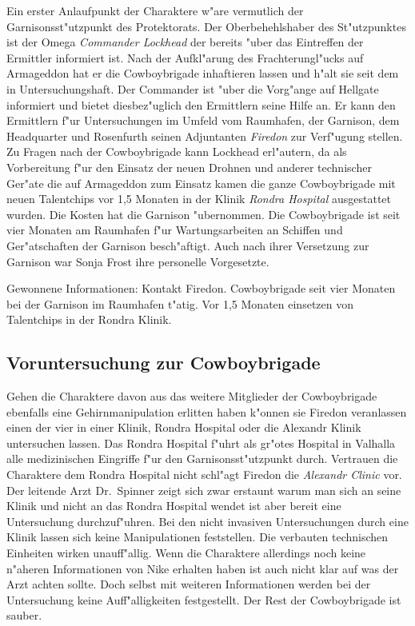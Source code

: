 Ein erster Anlaufpunkt der Charaktere w"are vermutlich der Garnisonsst"utzpunkt des Protektorats. Der Oberbehehlshaber des St"utzpunktes ist der Omega \emph{Commander Lockhead} der bereits "uber das Eintreffen der Ermittler informiert ist. Nach der Aufkl"arung des Frachterungl"ucks auf Armageddon hat er die Cowboybrigade inhaftieren lassen und h"alt sie seit dem in Untersuchungshaft. Der Commander ist "uber die Vorg"ange auf Hellgate informiert und bietet diesbez"uglich den Ermittlern seine Hilfe an. Er kann den Ermittlern f"ur Untersuchungen im Umfeld vom Raumhafen, der Garnison, dem Headquarter und Rosenfurth seinen Adjuntanten \emph{Firedon} zur Verf"ugung stellen. Zu Fragen nach der Cowboybrigade kann Lockhead erl"autern, da\3 als Vorbereitung f"ur den Einsatz der neuen Drohnen und anderer technischer Ger"ate die auf Armageddon zum Einsatz kamen die ganze Cowboybrigade mit neuen Talentchips vor 1,5 Monaten in der Klinik \emph{Rondra Hospital} ausgestattet wurden. Die Kosten hat die Garnison "ubernommen. Die Cowboybrigade ist seit vier Monaten am Raumhafen f"ur Wartungsarbeiten an Schiffen und Ger"atschaften der Garnison besch"aftigt. Auch nach ihrer Versetzung zur Garnison war Sonja Frost ihre personelle Vorgesetzte.

\begin{remarks}
	Gewonnene Informationen: Kontakt Firedon. Cowboybrigade seit vier Monaten bei der Garnison im Raumhafen t"atig. Vor 1,5 Monaten einsetzen von Talentchips in der Rondra Klinik.
\end{remarks}



\subsection{Voruntersuchung zur Cowboybrigade}

Gehen die Charaktere davon aus das weitere Mitglieder der Cowboybrigade ebenfalls eine Gehirnmanipulation erlitten haben k"onnen sie Firedon veranlassen einen der vier in einer Klinik, Rondra Hospital oder die Alexandr Klinik untersuchen lassen. Das Rondra Hospital f"uhrt als gr"o\3tes Hospital in Valhalla alle medizinischen Eingriffe f"ur den Garnisonsst"utzpunkt durch. Vertrauen die Charaktere dem Rondra Hospital nicht schl"agt Firedon die \emph{Alexandr Clinic} vor. Der leitende Arzt Dr.~Spinner zeigt sich zwar erstaunt warum man sich an seine Klinik und nicht an das Rondra Hospital wendet ist aber bereit eine Untersuchung durchzuf"uhren. Bei den nicht invasiven Untersuchungen durch eine Klinik lassen sich keine Manipulationen feststellen. Die verbauten technischen Einheiten wirken unauff"allig. Wenn die Charaktere allerdings noch keine n"aheren Informationen von Nike erhalten haben ist auch nicht klar auf was der Arzt achten sollte. Doch selbst mit weiteren Informationen werden bei der Untersuchung keine Auff"alligkeiten festgestellt. Der Rest der Cowboybrigade ist sauber.

